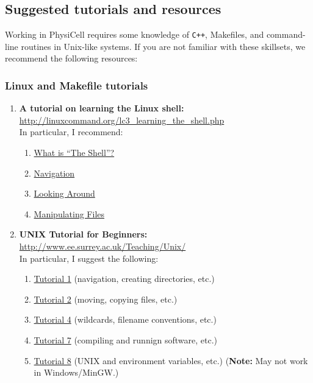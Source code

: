 \documentclass[12pt]{article}
\renewcommand{\v}{\verb}
\newcommand{\blue}[1]{\textcolor{blue}{#1}}
\newcommand{\DONE}{}%
\begin{document}
\subsection{Suggested tutorials and resources\DONE}
Working in PhysiCell requires some knowledge of \v|C++|, Makefiles, and command-line routines in Unix-like systems. 
If you are not familiar with these skillsets, we recommend the following resources:

\subsubsection{Linux and Makefile tutorials}
\begin{enumerate}
\item 
\textbf{A tutorial on learning the Linux shell:} \href{http://linuxcommand.org/lc3_learning_the_shell.php}{http://linuxcommand.org/lc3\_learning\_the\_shell.php} \\
In particular, I recommend: 
\begin{enumerate}
\item \href{http://linuxcommand.org/lc3_lts0010.php}{What is ``The Shell''?} 
\item \href{http://linuxcommand.org/lc3_lts0020.php}{Navigation}
\item \href{http://linuxcommand.org/lc3_lts0030.php}{Looking Around}
\item \href{http://linuxcommand.org/lc3_lts0050.php}{Manipulating Files}
\end{enumerate}

\item \textbf{UNIX Tutorial for Beginners: } \href{http://www.ee.surrey.ac.uk/Teaching/Unix/}{http://www.ee.surrey.ac.uk/Teaching/Unix/} \\
In particular, I suggest the following: 
\begin{enumerate}
\item \href{http://www.ee.surrey.ac.uk/Teaching/Unix/unix1.html}{Tutorial 1} (navigation, creating directories, etc.) 
\item \href{http://www.ee.surrey.ac.uk/Teaching/Unix/unix2.html}{Tutorial 2} (moving, copying files, etc.)
\item \href{http://www.ee.surrey.ac.uk/Teaching/Unix/unix4.html}{Tutorial 4} (wildcards, filename conventions, etc.)
\item \href{http://www.ee.surrey.ac.uk/Teaching/Unix/unix7.html}{Tutorial 7} (compiling and runnign software, etc.)
\item \href{http://www.ee.surrey.ac.uk/Teaching/Unix/unix8.html}{Tutorial 8} (UNIX and environment variables, etc.) (\textbf{Note:} 
May not work in Windows/MinGW.) 
\end{enumerate}


\end{enumerate}
\end{document}
